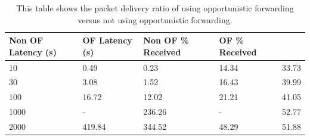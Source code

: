 {\begin{landscape}
\begin{table}
\begin{tabularx}{0.6\linewidth}{|X|X|X|X|X|}
                        \multicolumn{1}{|X|}{\centering Non OF Latency (s)} & 
                        \multicolumn{1}{|X|}{\centering OF Latency (s)} & 
                        \multicolumn{1}{|X|}{\centering Non OF \% Received} & 
                        \multicolumn{1}{|X|}{\centering OF \% Received} \\
                        \hline
                        10 & 0.49 & 0.23 & 14.34 & 33.73 \\
                        30 & 3.08 & 1.52 & 16.43 & 39.99 \\
                        100 & 16.72 & 12.02 & 21.21 & 41.05 \\
                        1000 & - & 236.26 & - & 52.77 \\
                        2000 & 419.84 & 344.52 & 48.29 & 51.88 \\
                        \hline
                    \end{tabularx}
                    \caption{This table shows the packet delivery ratio of using opportunistic forwarding versus not using opportunistic forwarding.}
                    \label{tab:opportunistic_forwarding}
                \end{table}
            \end{landscape}
        }

